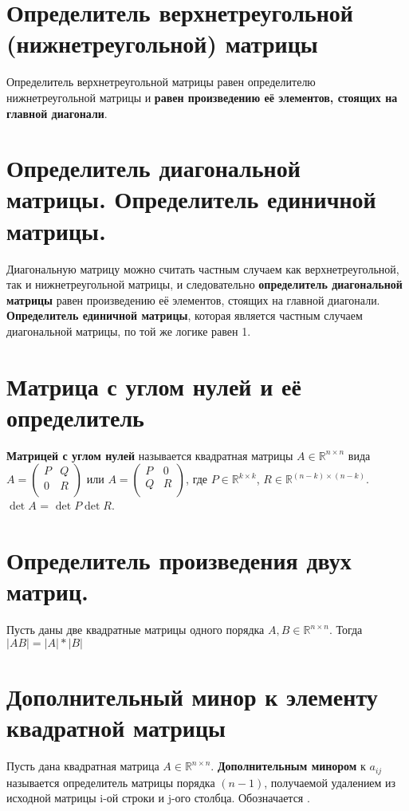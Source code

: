 \documentclass[a4paper,11pt]{report}
\begin{document}
\section{Определитель верхнетреугольной (нижнетреугольной) матрицы}
Определитель верхнетреугольной матрицы равен определителю нижнетреугольной матрицы и \textbf{равен
произведению её элементов, стоящих на главной диагонали}.
\section{Определитель диагональной матрицы. Определитель единичной матрицы.}
Диагональную матрицу можно считать частным случаем как верхнетреугольной, так и нижнетреугольной матрицы,
и следовательно \textbf{определитель диагональной матрицы} равен произведению её элементов, стоящих
на главной диагонали.\\
\textbf{Определитель единичной матрицы}, которая является частным случаем диагональной матрицы, по той же логике
равен 1.
\section{Матрица с углом нулей и её определитель}
\textbf{Матрицей с углом нулей} называется квадратная матрицы $A \in \mathbb{R}^{n\times{n}}$ вида
$A = 
\begin{pmatrix}
P & Q\\
0 & R\\
\end{pmatrix}
$ или $A = 
\begin{pmatrix}
P & 0\\
Q & R\\
\end{pmatrix}
$, где $P \in \mathbb{R}^{k\times{k}}$, $R \in \mathbb{R}^{(n-k)\times{(n-k)}}$.\\
\textbf{$\det A$} = $\det P\det R$.\\
\section{Определитель произведения двух матриц.}
Пусть даны две квадратные матрицы одного порядка $A, B \in \mathbb{R}^{n\times{n}}$. Тогда
$|AB| = |A| * |B|$
\section{Дополнительный минор к элементу квадратной матрицы}
Пусть дана квадратная матрица $A \in \mathbb{R}^{n\times{n}}$. \textbf{Дополнительным минором} к $a_{ij}$ называется
определитель матрицы порядка $(n - 1)$, получаемой удалением из исходной матрицы i-ой строки и j-ого столбца.
Обозначается .
\end{document}
